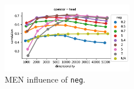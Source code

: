 \begin{figure}[h]
  \centering

  \includegraphics[width=0.5\textwidth]{supplement/figures/men-interaction-neg}

  \caption{MEN influence of \texttt{neg}.}
  \label{fig:men-neg}
\end{figure}
